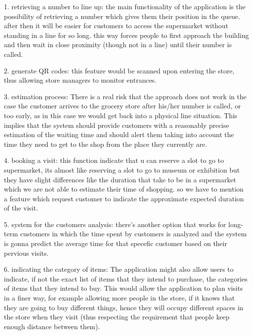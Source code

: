 1. retrieving a number to line up: the main functionality of the application is the possibility of retrieving a number  which gives them their position in the queue. after then it will be easier for customers to access the supermarket without standing in a line for so long.  this way  forces people to first approach the building and then wait in close proximity (though not in a line) until their number is called.

2. generate QR codes:  this feature would be scanned upon entering the store, thus allowing store managers to monitor entrances.

3. estimation process:  There is a real risk that the approach does not
work in the case the customer arrives to the grocery store after his/her number is called, or too early, as in this case we would get back into a physical line situation. This implies that the system should provide customers with a reasonably precise estimation of the waiting time and should alert them taking into account the time they need to get to the shop from the place they currently are.

4. booking a visit: this function indicate that u can reserve a slot to go to supermarket, its almost like reserving a slot to go to museum or exhibition but they have slight differences like the duration that take to be in a supermarket which we are not able to estimate their time of shopping. so we have to mention a feature which request customer to indicate the approximate expected duration of the visit.

5. system for the customers analysis: there's another option that works for long-term customers in which the time spent by customers is analyzed and the system is gonna predict the average time for that specefic customer based on their pervious visits.

6. indicating the category of items: The application might also allow users to indicate, if not the exact list of items that they intend to
purchase, the categories of items that they intend to buy. This would allow the application to plan visits in a finer way, for example allowing more people in the store, if it knows that they are going to buy different things, hence they will occupy different spaces in the store when they visit (thus respecting the requirement that people keep enough distance between them).